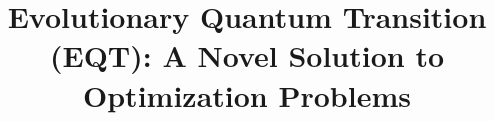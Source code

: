 \documentclass[conference]{IEEEtran}
\begin{document}
\title{Evolutionary Quantum Transition (EQT): A Novel Solution to Optimization Problems \\
}


\maketitle
\end{document}
